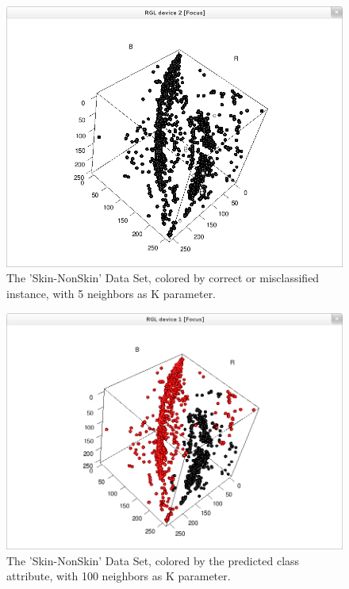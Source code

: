 \documentclass[paper=a4, fontsize=11pt]{scrartcl} %
\numberwithin{equation}{section} %
\numberwithin{figure}{section} %
\numberwithin{table}{section} %
\begin{document}
\begin{figure}[\textwidth]
    \begin{center}
\includegraphics[width=\textwidth]{Skin_correct_k5}
    \end{center}
\caption['Skin-NonSkin' correctness with k=5]{The 'Skin-NonSkin' Data Set, colored by correct or misclassified instance, with 5 neighbors as K parameter.}
\label{fig:skin:correct:k5}
\end{figure}

\begin{figure}[\textwidth]
    \begin{center}
\includegraphics[width=\textwidth]{Skin_predicted_k100}
    \end{center}
\caption['Skin-NonSkin' prediction with k=100]{The 'Skin-NonSkin' Data Set, colored by the predicted class attribute, with 100 neighbors as K parameter.}
\label{fig:skin:predicted:k100}
\end{figure}
\end{document}
